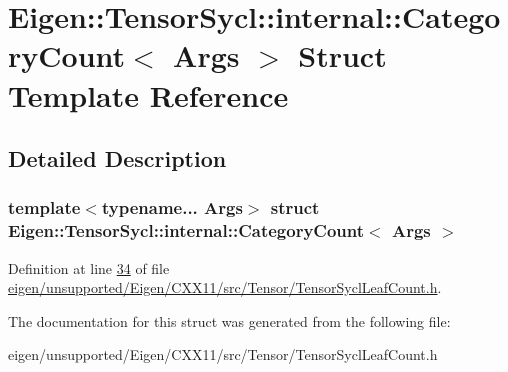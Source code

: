 \hypertarget{struct_eigen_1_1_tensor_sycl_1_1internal_1_1_category_count}{}\section{Eigen\+:\+:Tensor\+Sycl\+:\+:internal\+:\+:Category\+Count$<$ Args $>$ Struct Template Reference}
\label{struct_eigen_1_1_tensor_sycl_1_1internal_1_1_category_count}


\subsection{Detailed Description}
\subsubsection*{template$<$typename... Args$>$\newline
struct Eigen\+::\+Tensor\+Sycl\+::internal\+::\+Category\+Count$<$ Args $>$}



Definition at line \hyperlink{eigen_2unsupported_2_eigen_2_c_x_x11_2src_2_tensor_2_tensor_sycl_leaf_count_8h_source_l00034}{34} of file \hyperlink{eigen_2unsupported_2_eigen_2_c_x_x11_2src_2_tensor_2_tensor_sycl_leaf_count_8h_source}{eigen/unsupported/\+Eigen/\+C\+X\+X11/src/\+Tensor/\+Tensor\+Sycl\+Leaf\+Count.\+h}.



The documentation for this struct was generated from the following file\+:\begin{DoxyCompactItemize}
\item 
eigen/unsupported/\+Eigen/\+C\+X\+X11/src/\+Tensor/\+Tensor\+Sycl\+Leaf\+Count.\+h\end{DoxyCompactItemize}
